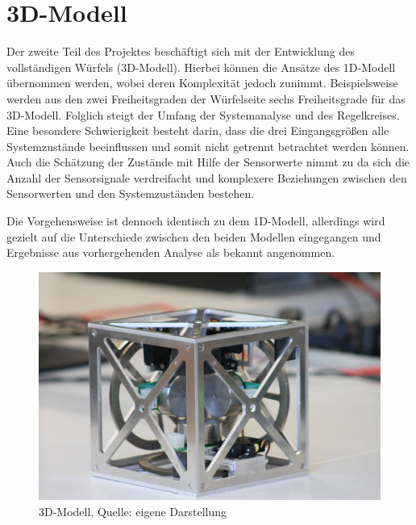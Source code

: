 \section{3D-Modell}
Der zweite Teil des Projektes beschäftigt sich mit der Entwicklung des vollständigen Würfels (3D-Modell). Hierbei können die Ansätze des 1D-Modell übernommen werden, wobei deren Komplexität jedoch zunimmt. Beispielsweise werden aus den zwei Freiheitsgraden der Würfelseite sechs Freiheitsgrade für das 3D-Modell. Folglich steigt der Umfang der Systemanalyse und des Regelkreises. Eine besondere Schwierigkeit besteht darin, dass die drei Eingangsgrößen alle Systemzustände beeinflussen und somit nicht getrennt betrachtet werden können. Auch die Schätzung der Zustände mit Hilfe der Sensorwerte nimmt zu da sich die Anzahl der Sensorsignale verdreifacht und komplexere Beziehungen zwischen den Sensorwerten und den Systemzuständen bestehen.

Die Vorgehensweise ist dennoch identisch zu dem 1D-Modell, allerdings wird gezielt auf die Unterschiede zwischen den beiden Modellen eingegangen und Ergebnisse aus vorhergehenden Analyse als bekannt angenommen.

\begin{figure}[h!]
\includegraphics[width=\linewidth]{img/3D_Modell_img.JPG}
\caption{3D-Modell, Quelle: eigene Darstellung}
\end{figure}